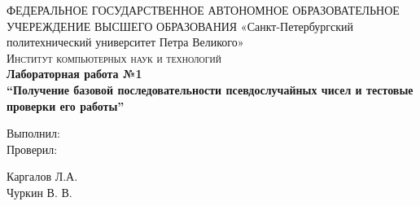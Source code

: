 \documentclass{article}
\begin{document}
	\begin{titlepage}
		\center 
		ФЕДЕРАЛЬНОЕ ГОСУДАРСТВЕННОЕ АВТОНОМНОЕ ОБРАЗОВАТЕЛЬНОЕ УЧЕРЕЖДЕНИЕ ВЫСШЕГО ОБРАЗОВАНИЯ\linebreak  
		«Санкт-Петербургский политехнический университет Петра Великого»\\[2cm]
		\textsc{\Large Институт компьютерных наук и технологий}\\[6.5cm]
		
		{\huge \bfseries Лабораторная работа №1\\[0.4cm]
			\Large \mdseries “Получение базовой последовательности псевдослучайных чисел и тестовые проверки его работы”}\\[6.5cm]
		
		\begin{multicols}{2}
			\begin{flushright} \large
				
				{Выполнил:}\\[0.5cm]
				
				{Проверил:}
				
			\end{flushright}
			\begin{flushright}
				
				{Каргалов Л.А.}\\[0.5cm]
				
				{Чуркин В. В.}
				
			\end{flushright}
		\end{multicols}

		\flushright{
			{\today}\\[0.5cm]
		}
		
		\vfill %
	\end{titlepage}
	
	\tableofcontents
	\setcounter{page}{2}
	\newpage
	
\end{document}
